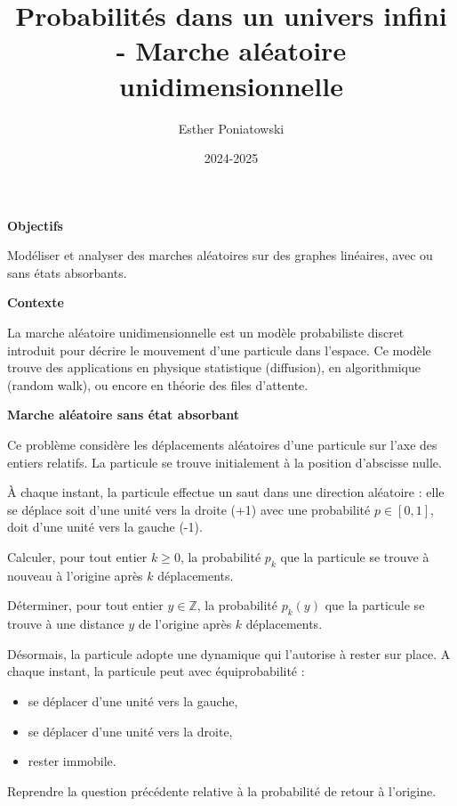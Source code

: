 \documentclass[10pt,a4paper]{article}
\title{Probabilités dans un univers infini - Marche aléatoire unidimensionnelle}
\author{Esther Poniatowski}
\date{2024-2025}
\begin{document}
\textbf{Objectifs}

Modéliser et analyser des marches aléatoires sur des graphes linéaires, avec ou sans états
absorbants.

\bigskip
\textbf{Contexte}

La marche aléatoire unidimensionnelle est un modèle probabiliste discret introduit pour décrire le
mouvement d'une particule dans l'espace. Ce modèle trouve des applications en physique statistique
(diffusion), en algorithmique (random walk), ou encore en théorie des files d'attente.

\bigskip
\textbf{Marche aléatoire sans état absorbant}

Ce problème considère les déplacements aléatoires d'une particule sur l'axe des entiers relatifs. La
particule se trouve initialement à la position d'abscisse nulle.

À chaque instant, la particule effectue un saut dans une direction aléatoire : elle se déplace soit
d'une unité vers la droite (+1) avec une probabilité \( p \in [0, 1] \), doit d'une unité vers la
gauche (-1).

\q Calculer, pour tout entier \( k \geq 0 \), la probabilité \( p_k \) que la particule se trouve à
nouveau à l'origine après \( k \) déplacements.

\q Déterminer, pour tout entier \( y \in \mathbb{Z} \), la probabilité \( p_k(y) \) que la particule
se trouve à une distance \( y \) de l'origine après \( k \) déplacements.

\bigskip

Désormais, la particule adopte une dynamique qui l'autorise à rester sur place. A chaque instant, la
particule peut avec équiprobabilité :
\begin{itemize}
 \item se déplacer d'une unité vers la gauche,
 \item se déplacer d'une unité vers la droite,
 \item rester immobile.
\end{itemize}

\q Reprendre la question précédente relative à la probabilité de retour à l'origine.
\end{document}

